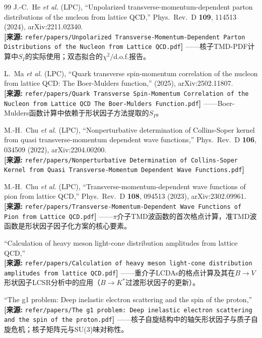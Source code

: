 \documentclass[12pt,a4paper]{ctexart}
\theoremstyle{definition}
\begin{document}
\begin{thebibliography}{99}
J.-C.~He \textit{et al.} (LPC),
``Unpolarized transverse-momentum-dependent parton distributions of the nucleon from lattice QCD,''
Phys.\ Rev.\ D \textbf{109}, 114513 (2024), arXiv:2211.02340.
\\\textbf{[来源:} \texttt{refer/papers/Unpolarized Transverse-Momentum-Dependent Parton Distributions of the Nucleon from Lattice QCD.pdf}\textbf{]}
——核子TMD-PDF计算中$S_I$的实际使用；双态拟合的$\chi^2/$d.o.f.报告。

L.~Ma \textit{et al.} (LPC),
``Quark transverse spin-momentum correlation of the nucleon from lattice QCD: The Boer-Mulders function,''
(2025), arXiv:2502.11807.
\\\textbf{[来源:} \texttt{refer/papers/Quark Transverse Spin-Momentum Correlation of the Nucleon from Lattice QCD The Boer-Mulders Function.pdf}\textbf{]}
——Boer-Mulders函数计算中依赖于形状因子方法提取的$S_I$。

M.-H.~Chu \textit{et al.} (LPC),
``Nonperturbative determination of Collins-Soper kernel from quasi transverse-momentum dependent wave functions,''
Phys.\ Rev.\ D \textbf{106}, 034509 (2022), arXiv:2204.00200.
\\\textbf{[来源:} \texttt{refer/papers/Nonperturbative Determination of Collins-Soper Kernel from Quasi Transverse-Momentum Dependent Wave Functions.pdf}\textbf{]}

M.-H.~Chu \textit{et al.} (LPC),
``Transverse-momentum-dependent wave functions of pion from lattice QCD,''
Phys.\ Rev.\ D \textbf{108}, 094513 (2023), arXiv:2302.09961.
\\\textbf{[来源:} \texttt{refer/papers/Transverse-Momentum-Dependent Wave Functions of Pion from Lattice QCD.pdf}\textbf{]}
——$\pi$介子TMD波函数的首次格点计算，准TMD波函数是形状因子因子化方案的核心要素。

``Calculation of heavy meson light-cone distribution amplitudes from lattice QCD,''
\\\textbf{[来源:} \texttt{refer/papers/Calculation of heavy meson light-cone distribution amplitudes from lattice QCD.pdf}\textbf{]}
——重介子LCDAs的格点计算及其在$B\to V$形状因子LCSR分析中的应用（$B\to K^*$过渡形状因子的更新）。

``The g1 problem: Deep inelastic electron scattering and the spin of the proton,''
\\\textbf{[来源:} \texttt{refer/papers/The g1 problem: Deep inelastic electron scattering and the spin of the proton.pdf}\textbf{]}
——核子自旋结构中的轴矢形状因子与质子自旋危机；核子矩阵元与SU(3)味对称性。


\end{thebibliography}
\end{document}
